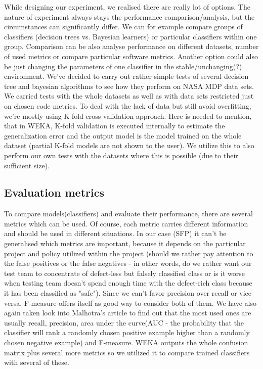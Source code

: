 While designing our experiment, we realised there are really lot of options. The nature of experiment always stays the performance comparison/analysis, but the circumstances can significantly differ. We can for example compare groups of classifiers (decision trees vs. Bayesian learners) or particular classifiers within one group. Comparison can be also analyse performance on different datasets, number of used metrics or compare particular software metrics. Another option could also be just changing the parameters of one classifier in the stable/unchanging(?) environment. We've decided to carry out rather simple tests of several decision tree and bayesian algorithms to see how they perform on NASA MDP data sets. We carried tests with the whole datasets as well as with data sets restricted just on chosen code metrics. To deal with the lack of data but still avoid overfitting, we're mostly using K-fold cross validation approach. Here is needed to mention, that in WEKA, K-fold validation is executed internally to estimate the generalization error and the output model is the model trained on the whole dataset (partial K-fold models are not shown to the user). We utilize this to also perform our own tests with the datasets where this is possible (due to their sufficient size).

\subsection{Evaluation metrics}
To compare models(classifiers) and evaluate their performance, there are several metrics which can be used. Of course, each metric carries different information and should be used in different situations. In our case (SFP) it can't be generalised which metrics are important, because it depends on the particular project and policy utilized within the project (should we rather pay attention to the false positives or the false negatives - in other words, do we rather want our test team to concentrate of defect-less but falsely classified class or is it worse when testing team doesn't spend enough time with the defect-rich class because it has been classified as "safe"). Since we can't favor precision over recall or vice versa, F-measure offers itself as good way to consider both of them. We have also again taken look into Malhotra's article\cite{malhotra2015systematic} to find out that the most used ones are usually recall, precision, area under the curve(AUC - the probability that the classifier will rank a randomly chosen positive example higher than a randomly chosen negative example\cite{japkowicz2011evaluating}) and F-measure. WEKA outputs the whole confusion matrix plus several more metrics so we utilized it to compare trained classifiers with several of these. 